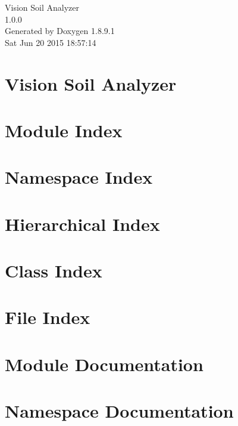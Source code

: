 \documentclass[twoside]{book}
\newcommand{\+}{\discretionary{\mbox{\scriptsize$\hookleftarrow$}}{}{}}
\newcommand{\clearemptydoublepage}{%
  \newpage{\pagestyle{empty}\cleardoublepage}%
}
\begin{document}
\hypersetup{pageanchor=false,
             bookmarks=true,
             bookmarksnumbered=true,
             pdfencoding=unicode
            }
\begin{titlepage}
\vspace*{7cm}
\begin{center}%
{\Large Vision Soil Analyzer \\[1ex]\large 1.\+0.\+0 }\\
\vspace*{1cm}
{\large Generated by Doxygen 1.8.9.1}\\
\vspace*{0.5cm}
{\small Sat Jun 20 2015 18:57:14}\\
\end{center}
\end{titlepage}
\clearemptydoublepage
\tableofcontents
\clearemptydoublepage
{}
\hypersetup{pageanchor=true}

\chapter{Vision Soil Analyzer}
\label{index}\hypertarget{index}{}
\chapter{Module Index}

\chapter{Namespace Index}

\chapter{Hierarchical Index}

\chapter{Class Index}

\chapter{File Index}

\chapter{Module Documentation}

\chapter{Namespace Documentation}












\end{document}
